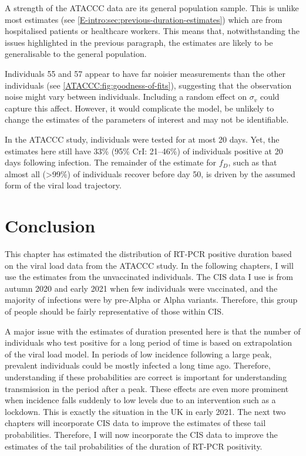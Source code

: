 \documentclass[thesis.tex]{subfiles}
\begin{document}
A strength of the ATACCC data are its general population sample.
This is unlike most estimates (see \cref{E-intro:sec:previous-duration-estimates}) which are from hospitalised patients or healthcare workers.
This means that, notwithstanding the issues highlighted in the previous paragraph, the estimates are likely to be generalisable to the general population.

Individuals 55 and 57 appear to have far noisier measurements than the other individuals (see \cref{ATACCC:fig:goodness-of-fits}), suggesting that the observation noise might vary between individuals.
Including a random effect on $\sigma_v$ could capture this affect.
However, it would complicate the model, be unlikely to change the estimates of the parameters of interest and may not be identifiable.

In the ATACCC study, individuals were tested for at most 20 days.
Yet, the estimates here still have 33\% (95\% CrI: 21--46\%) of individuals positive at 20 days following infection.
The remainder of the estimate for $f_D$, such as that almost all (>99\%) of individuals recover before day 50, is driven by the assumed form of the viral load trajectory.

\section{Conclusion}

This chapter has estimated the distribution of RT-PCR positive duration based on the viral load data from the ATACCC study.
In the following chapters, I will use the estimates from the unvaccinated individuals.
The CIS data I use is from autumn 2020 and early 2021 when few individuals were vaccinated, and the majority of infections were by pre-Alpha or Alpha variants.
Therefore, this group of people should be fairly representative of those within CIS.

A major issue with the estimates of duration presented here is that the number of individuals who test positive for a long period of time is based on extrapolation of the viral load model.
In periods of low incidence following a large peak, prevalent individuals could be mostly infected a long time ago.
Therefore, understanding if these probabilities are correct is important for understanding transmission in the period after a peak.
These effects are even more prominent when incidence falls suddenly to low levels due to an intervention such as a lockdown.
This is exactly the situation in the UK in early 2021.
The next two chapters will incorporate CIS data to improve the estimates of these tail probabilities.
Therefore, I will now incorporate the CIS data to improve the estimates of the tail probabilities of the duration of RT-PCR positivity.

\ifSubfilesClassLoaded{
  \appendix
  
  
  \listoftodos
}{}
\end{document}
